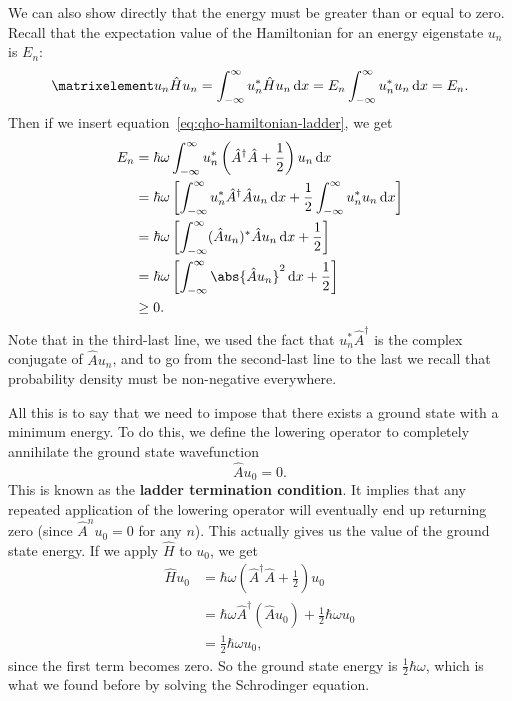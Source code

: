 \documentclass[../quantum_mechanics.tex]{subfiles}
\begin{document}
            We can also show directly that the energy must be greater than or equal to zero.
            Recall that the expectation value of the Hamiltonian for an energy eigenstate $u_n$ is $E_n$:
            \begin{equation}
                \expval{\hat{H}}{u_n}=\int_{-\infty}^\infty u_n^\ast\hat{H}u_n\dd{x}=E_n\int_{-\infty}^\infty u_n^\ast u_n\dd{x}=E_n.
            \end{equation}
            Then if we insert equation~\ref{eq:qho-hamiltonian-ladder}, we get
            \begin{align}
                E_n&=\hbar\omega\int_{-\infty}^\infty u_n^\ast\left(\hat{A}^\dagger\hat{A}+\frac{1}{2}\right)u_n\dd{x}\\
                &=\hbar\omega\left[\int_{-\infty}^\infty u_n^\ast\hat{A}^\dagger\hat{A}u_n\dd{x}+\frac{1}{2}\int_{-\infty}^\infty u_n^\ast u_n\dd{x}\right]\\
                &=\hbar\omega\left[\int_{-\infty}^\infty(\hat{A}u_n)^\ast\hat{A}u_n\dd{x}+\frac{1}{2}\right]\\
                &=\hbar\omega\left[\int_{-\infty}^\infty\abs{\hat{A}u_n}^2\dd{x}+\frac{1}{2}\right]\\
                &\geq 0.
            \end{align}
            Note that in the third-last line, we used the fact that $u_n^\ast\hat{A}^\dagger$ is the complex conjugate of $\hat{A}u_n$, and to go from the second-last line to the last we recall that probability density must be non-negative everywhere.

            All this is to say that we need to impose that there exists a ground state with a minimum energy.
            To do this, we define the lowering operator to completely annihilate the ground state wavefunction
            \begin{equation}
                \hat{A}u_0=0.
            \end{equation}
            This is known as the \textbf{ladder termination condition}.
            It implies that any repeated application of the lowering operator will eventually end up returning zero (since $\hat{A}^n u_0=0$ for any $n$).
            This actually gives us the value of the ground state energy.
            If we apply $\hat{H}$ to $u_0$, we get
            \begin{align}
                \hat{H}u_0&=\hbar\omega\left(\hat{A}^\dagger\hat{A}+\frac{1}{2}\right)u_0\\
                &=\hbar\omega\hat{A}^\dagger(\hat{A}u_0)+\frac{1}{2}\hbar\omega u_0\\
                &=\frac{1}{2}\hbar\omega u_0,
            \end{align}
            since the first term becomes zero.
            So the ground state energy is $\frac{1}{2}\hbar\omega$, which is what we found before by solving the Schrodinger equation.
\end{document}
